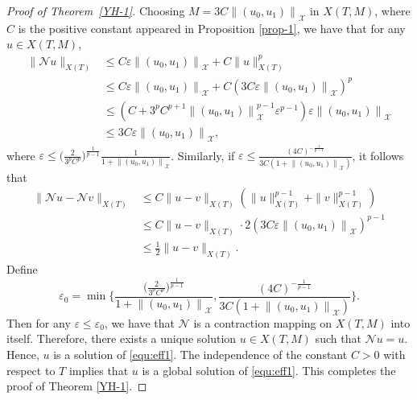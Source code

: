 \documentclass[11pt,twoside]{article}
\newcommand{\ve}{\varepsilon}
\newcommand{\f}{\frac}
\theoremstyle{plain}
\theoremstyle{definition}
\theoremstyle{remark}
\numberwithin{equation}{section}
\begin{document}
\begin{proof}
[Proof of Theorem~\ref{YH-1}]
 Choosing $M=3C\left\|\left(u_{0}, u_{1}\right)\right\|_{\mathcal{X}}$ in $X(T, M)$, where $C$ is the positive constant appeared in
 Proposition \ref{prop-1}, we have that for any $u \in X(T, M)$,
\begin{equation}\label{L6}
\begin{aligned}
\|\mathcal{N} u\|_{X(T)}
& \leq C\ve\left\|\left(u_{0}, u_{1}\right)\right\|_{\mathcal{X}}+C\|u\|_{X(T)}^{p} \\
& \leq C \ve\left\|\left(u_{0}, u_{1}\right)\right\|_{\mathcal{X}}+C\left(3 C\ve\left\|\left(u_{0}, u_{1}\right)\right\|_{\mathcal{X}}\right)^{p} \\
& \leq\left(C+3^{p} C^{p+1}\left\|\left(u_{0}, u_{1}\right)\right\|_{\mathcal{X}}^{p-1}\ve^{p-1}\right)\ve\left\|\left(u_{0}, u_{1}\right)\right\|_{\mathcal{X}} \\
& \leq 3 C\ve\left\|\left(u_{0}, u_{1}\right)\right\|_{\mathcal{X}},
\end{aligned}
\end{equation}
where $\ve\le \big(\f{2}{3^pC^p}\big)^{\f{1}{p-1}}\f{1}{1+\left\|\left(u_{0}, u_{1}\right)\right\|_{\mathcal{X}}}$. Similarly, if $\ve\le\f{{(4C)}^{-\f{1}{p-1}}}{3C(1+\left\|\left(u_{0}, u_{1}\right)\right\|_{\mathcal{X}})}$, it follows that
\begin{equation}\label{L7}
\begin{aligned}
\|\mathcal{N} u-\mathcal{N} v\|_{X(T)} &\leq C\|u-v\|_{X(T)}\left(\|u\|_{X(T)}^{p-1}+\|v\|_{X(T)}^{p-1}\right)\\
&\leq C\|u-v\|_{X(T)}\cdot2\left(3 C\ve\left\|\left(u_{0}, u_{1}\right)\right\|_{\mathcal{X}}\right)^{p-1}\\
&\leq \f{1}{2}\|u-v\|_{X(T)}.
\end{aligned}
\end{equation}
Define $$\varepsilon_0=\min\{\f{\big(\f{2}{3^pC^p}\big)^{\f{1}{p-1}}}{1+\left\|\left(u_{0}, u_{1}\right)\right\|_{\mathcal{X}}},\f{{(4C)}^{-\f{1}{p-1}}}{3C(1+\left\|\left(u_{0}, u_{1}\right)\right\|_{\mathcal{X}})}\}.$$
Then for any $\ve\leq \varepsilon_0$,
we have that $\mathcal{N}$ is a contraction mapping on $X(T, M)$ into itself. Therefore, there exists a unique solution $u \in X(T, M)$ such that
$\mathcal{N}u=u$. Hence,  $u$ is a  solution  of \eqref{equ:eff1}. The independence of the constant $C>0$ with respect to $T$ implies that $u$ is a global solution of \eqref{equ:eff1}. This completes the proof of Theorem \ref{YH-1}.
\end{proof}
\end{document}
